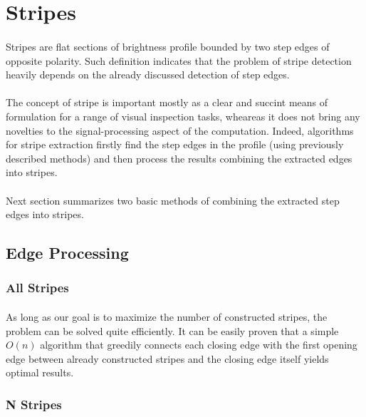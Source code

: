 \section{Stripes}

\paragraph*{}
Stripes are flat sections of brightness profile bounded by two step edges of opposite polarity. Such definition indicates that the problem of stripe detection heavily depends on the already discussed detection of step edges. 

\paragraph*{}
The concept of stripe is important mostly as a clear and succint means of formulation for a range of visual inspection tasks, wheareas it does not bring any novelties to the signal-processing aspect of the computation. Indeed, algorithms for stripe extraction firstly find the step edges in the profile (using previously described methods) and then process the results combining the extracted edges into stripes. 

\paragraph*{}
Next section summarizes two basic methods of combining the extracted step edges into stripes.

\subsection{Edge Processing}

\subsubsection{All Stripes}

\paragraph*{} As long as our goal is to maximize the number of constructed stripes, the problem can be solved quite efficiently. It can be easily proven that a simple $O(n)$ algorithm that greedily connects each closing edge with the first opening edge between already constructed stripes and the closing edge itself yields optimal results.

\subsubsection{N Stripes}

